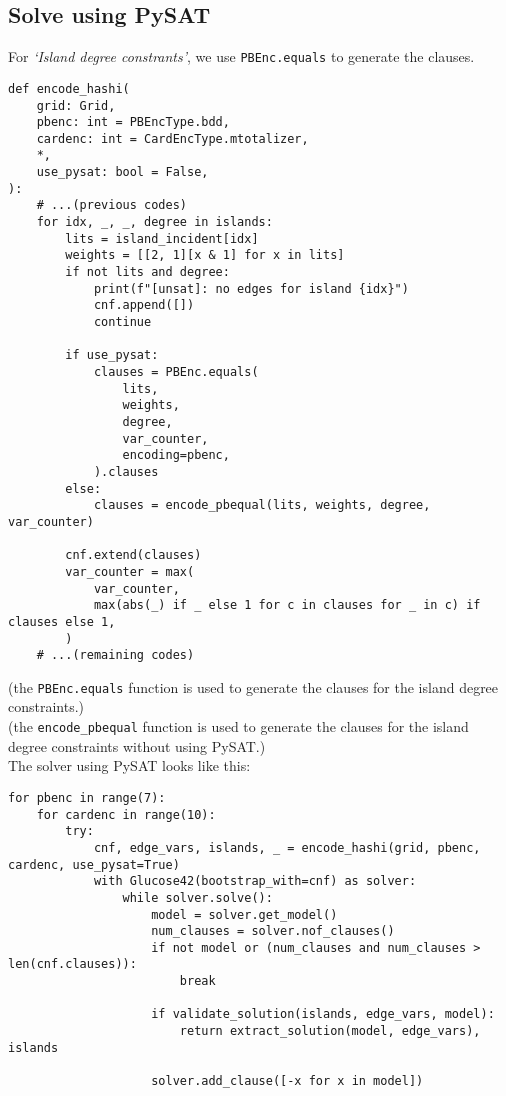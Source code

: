 \subsection{Solve using PySAT}
\begin{flushleft}
    For \textit{`Island degree constrants'}, we use \verb|PBEnc.equals| to generate the clauses.
    \begin{verbatim}
def encode_hashi(
    grid: Grid,
    pbenc: int = PBEncType.bdd,
    cardenc: int = CardEncType.mtotalizer,
    *,
    use_pysat: bool = False,
):
    # ...(previous codes)
    for idx, _, _, degree in islands:
        lits = island_incident[idx]
        weights = [[2, 1][x & 1] for x in lits]
        if not lits and degree:
            print(f"[unsat]: no edges for island {idx}")
            cnf.append([])
            continue

        if use_pysat:    
            clauses = PBEnc.equals(
                lits,
                weights,
                degree,
                var_counter,
                encoding=pbenc,
            ).clauses
        else:
            clauses = encode_pbequal(lits, weights, degree, var_counter)

        cnf.extend(clauses)
        var_counter = max(
            var_counter,
            max(abs(_) if _ else 1 for c in clauses for _ in c) if clauses else 1,
        )
    # ...(remaining codes)
\end{verbatim}
    (the \verb|PBEnc.equals| function is used to generate the clauses for the island degree constraints.)\\
    (the \verb|encode_pbequal| function is used to generate the clauses for the island degree constraints without using PySAT\@.)
    \\[2\baselineskip]
    The solver using PySAT looks like this:
    \begin{verbatim}
for pbenc in range(7):
    for cardenc in range(10):
        try:
            cnf, edge_vars, islands, _ = encode_hashi(grid, pbenc, cardenc, use_pysat=True)
            with Glucose42(bootstrap_with=cnf) as solver:
                while solver.solve():
                    model = solver.get_model()
                    num_clauses = solver.nof_clauses()
                    if not model or (num_clauses and num_clauses > len(cnf.clauses)):
                        break

                    if validate_solution(islands, edge_vars, model):
                        return extract_solution(model, edge_vars), islands

                    solver.add_clause([-x for x in model])
\end{verbatim}
\end{flushleft}
